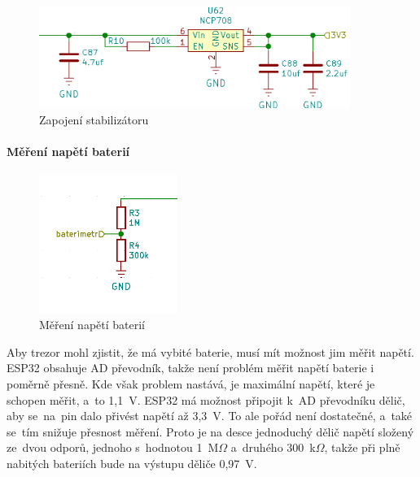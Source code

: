 \begin{figure}[h]
    \centering
    \includegraphics[width=0.9\textwidth]{kapitoly/obrazky/E4/napajeni/stabilizator.png}
    \caption{Zapojení stabilizátoru}
    \label{fig:E4-stabilizator}
\end{figure}

\newpage

\paragraph*{Měření napětí baterií}

\begin{figure}
    \centering
    \includegraphics[width=0.4\textwidth]{kapitoly/obrazky/E4/napajeni/delic_baterimetru.png}
    \caption{Měření napětí baterií\label{fig:baterimetr}}
\end{figure}

Aby trezor mohl zjistit, že má vybité baterie, musí mít možnost jim měřit napětí. ESP32 obsahuje AD převodník, takže není problém měřit napětí baterie 
i poměrně přesně. Kde však problem nastává, je maximální napětí, které je schopen měřit, a~to 1,1~V. ESP32 má možnost připojit k~AD převodníku dělič,
aby se~na~pin dalo přivést napětí až 3,3~V. To ale pořád není dostatečné, a~také se~tím snižuje přesnost měření. Proto je na desce jednoduchý dělič napětí
složený ze~dvou odporů, jednoho s~hodnotou 1~M$\Omega$ a~druhého 300~k$\Omega$, takže při plně nabitých bateriích bude na výstupu děliče 0,97~V. %